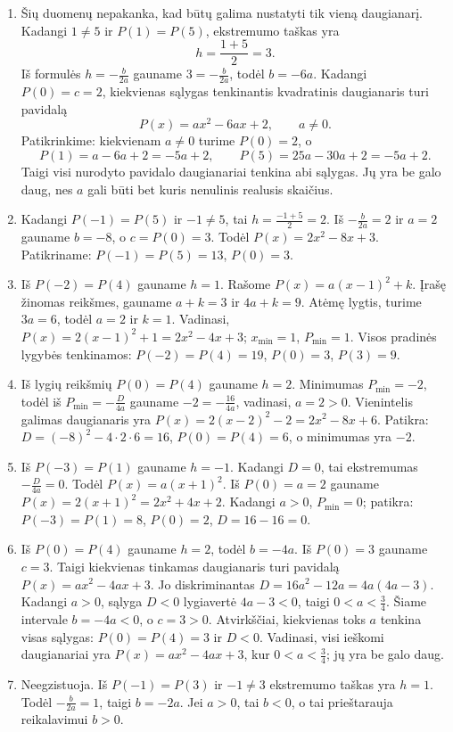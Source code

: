 \documentclass[12pt,a4paper]{article}
\begin{document}
\begin{enumerate}
\textbf{d)} Kaip ir c) dalyje, ekstremumo taškas yra $h=2$. Rašome $P(x)=a(x-2)^2+3$, kur $a<0$. Iš $P(0)=4a+3=1$ gauname $a=-\frac{1}{2}$. Vienintelis daugianaris yra $P(x)=-\frac{1}{2}(x-2)^2+3=-\frac{1}{2}x^2+2x+1$.
\item Šių duomenų nepakanka, kad būtų galima nustatyti tik vieną daugianarį. Kadangi $1\ne5$ ir $P(1)=P(5)$, ekstremumo taškas yra
\[
h=\frac{1+5}{2}=3.
\]
Iš formulės $h=-\frac{b}{2a}$ gauname $3=-\frac{b}{2a}$, todėl $b=-6a$. Kadangi $P(0)=c=2$, kiekvienas sąlygas tenkinantis kvadratinis daugianaris turi pavidalą
\[
P(x)=ax^2-6ax+2,\qquad a\ne0.
\]
Patikrinkime: kiekvienam $a\ne0$ turime $P(0)=2$, o
\[
P(1)=a-6a+2=-5a+2,\qquad
P(5)=25a-30a+2=-5a+2.
\]
Taigi visi nurodyto pavidalo daugianariai tenkina abi sąlygas. Jų yra be galo daug, nes $a$ gali būti bet kuris nenulinis realusis skaičius.
\item Kadangi $P(-1)=P(5)$ ir $-1\ne5$, tai $h=\frac{-1+5}{2}=2$. Iš $-\frac{b}{2a}=2$ ir $a=2$ gauname $b=-8$, o $c=P(0)=3$. Todėl $P(x)=2x^2-8x+3$. Patikriname: $P(-1)=P(5)=13$, $P(0)=3$.
\item Iš $P(-2)=P(4)$ gauname $h=1$. Rašome $P(x)=a(x-1)^2+k$. Įrašę žinomas reikšmes, gauname $a+k=3$ ir $4a+k=9$. Atėmę lygtis, turime $3a=6$, todėl $a=2$ ir $k=1$. Vadinasi, $P(x)=2(x-1)^2+1=2x^2-4x+3$; $x_{\min}=1$, $P_{\min}=1$. Visos pradinės lygybės tenkinamos: $P(-2)=P(4)=19$, $P(0)=3$, $P(3)=9$.
\item Iš lygių reikšmių $P(0)=P(4)$ gauname $h=2$. Minimumas $P_{\min}=-2$, todėl iš $P_{\min}=-\frac{D}{4a}$ gauname $-2=-\frac{16}{4a}$, vadinasi, $a=2>0$. Vienintelis galimas daugianaris yra $P(x)=2(x-2)^2-2=2x^2-8x+6$. Patikra: $D=(-8)^2-4\cdot2\cdot6=16$, $P(0)=P(4)=6$, o minimumas yra $-2$.
\item Iš $P(-3)=P(1)$ gauname $h=-1$. Kadangi $D=0$, tai ekstremumas $-\frac{D}{4a}=0$. Todėl $P(x)=a(x+1)^2$. Iš $P(0)=a=2$ gauname $P(x)=2(x+1)^2=2x^2+4x+2$. Kadangi $a>0$, $P_{\min}=0$; patikra: $P(-3)=P(1)=8$, $P(0)=2$, $D=16-16=0$.
\item Iš $P(0)=P(4)$ gauname $h=2$, todėl $b=-4a$. Iš $P(0)=3$ gauname $c=3$. Taigi kiekvienas tinkamas daugianaris turi pavidalą $P(x)=ax^2-4ax+3$. Jo diskriminantas $D=16a^2-12a=4a(4a-3)$. Kadangi $a>0$, sąlyga $D<0$ lygiavertė $4a-3<0$, taigi $0<a<\frac{3}{4}$. Šiame intervale $b=-4a<0$, o $c=3>0$. Atvirkščiai, kiekvienas toks $a$ tenkina visas sąlygas: $P(0)=P(4)=3$ ir $D<0$. Vadinasi, visi ieškomi daugianariai yra $P(x)=ax^2-4ax+3$, kur $0<a<\frac{3}{4}$; jų yra be galo daug.
\item Neegzistuoja. Iš $P(-1)=P(3)$ ir $-1\ne3$ ekstremumo taškas yra $h=1$. Todėl $-\frac{b}{2a}=1$, taigi $b=-2a$. Jei $a>0$, tai $b<0$, o tai prieštarauja reikalavimui $b>0$.

\end{enumerate}
\end{document}
